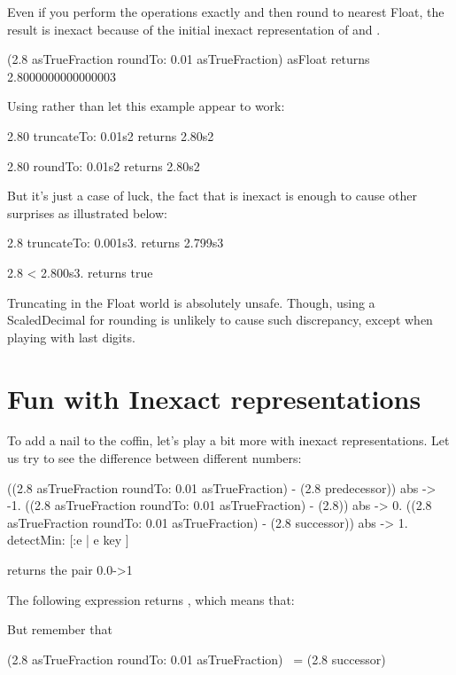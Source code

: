 \documentclass[a4paper,10pt,twoside]{book}
\begin{document}
Even if you perform the operations exactly and then round to nearest Float, the result is inexact because of the initial inexact representation of   and  . 
\begin{code}{}
(2.8 asTrueFraction roundTo: 0.01 asTrueFraction) asFloat
	returns 2.8000000000000003
\end{code}

Using  rather than   let this example appear to work:
\begin{code}{}
2.80 truncateTo: 0.01s2
	returns  2.80s2
	
2.80 roundTo: 0.01s2
	returns  2.80s2
\end{code}

But it's just a case of luck, the fact that  is inexact is enough to cause other surprises as illustrated below:
\begin{code}{}
2.8 truncateTo: 0.001s3.
	returns 2.799s3
	
2.8 < 2.800s3.
	returns true
\end{code}

Truncating in the Float world is absolutely unsafe. Though, using a ScaledDecimal for rounding is unlikely to cause such discrepancy, except when playing with last digits.



\section{Fun with Inexact representations}
To add a nail to the coffin, let's play a bit more with inexact representations. Let us try to see the difference between different numbers: 

\begin{code}{}
{
((2.8 asTrueFraction roundTo: 0.01 asTrueFraction) - (2.8 predecessor)) abs -> -1.
((2.8 asTrueFraction roundTo: 0.01 asTrueFraction) - (2.8)) abs -> 0.
((2.8 asTrueFraction roundTo: 0.01 asTrueFraction) - (2.8 successor)) abs -> 1.
} detectMin: [:e | e key ]

returns the pair
	0.0->1
\end{code}

The following expression returns , which means that:

But remember that 

\begin{code}{}
(2.8 asTrueFraction roundTo: 0.01 asTrueFraction) ~= (2.8 successor)
\end{code}
\end{document}
